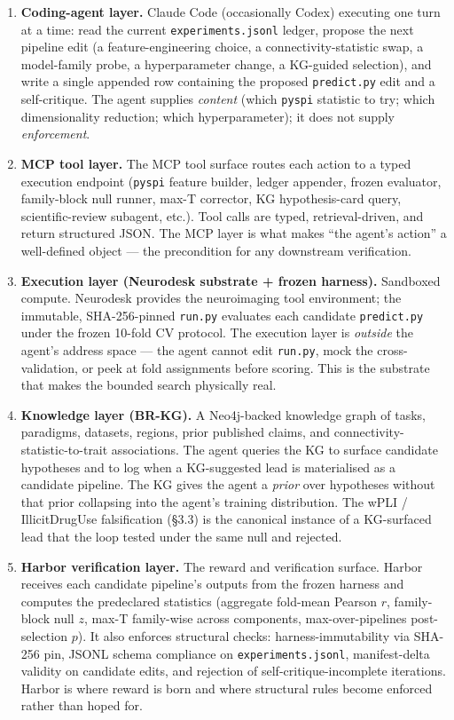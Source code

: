\documentclass[11pt,letterpaper]{report}
\begin{document}
\begin{enumerate}[leftmargin=1.6em,itemsep=0.25em]
\item \textbf{Coding-agent layer.} Claude Code (occasionally Codex) executing one turn at a time: read the current \texttt{experiments.jsonl} ledger, propose the next pipeline edit (a feature-engineering choice, a connectivity-statistic swap, a model-family probe, a hyperparameter change, a KG-guided selection), and write a single appended row containing the proposed \texttt{predict.py} edit and a self-critique. The agent supplies \emph{content} (which \texttt{pyspi} statistic to try; which dimensionality reduction; which hyperparameter); it does not supply \emph{enforcement}.
\item \textbf{MCP tool layer.} The MCP tool surface routes each action to a typed execution endpoint (\texttt{pyspi} feature builder, ledger appender, frozen evaluator, family-block null runner, max-T corrector, KG hypothesis-card query, scientific-review subagent, etc.). Tool calls are typed, retrieval-driven, and return structured JSON. The MCP layer is what makes ``the agent's action'' a well-defined object --- the precondition for any downstream verification.
\item \textbf{Execution layer (Neurodesk substrate + frozen harness).} Sandboxed compute. Neurodesk provides the neuroimaging tool environment; the immutable, SHA-256-pinned \texttt{run.py} evaluates each candidate \texttt{predict.py} under the frozen 10-fold CV protocol. The execution layer is \emph{outside} the agent's address space --- the agent cannot edit \texttt{run.py}, mock the cross-validation, or peek at fold assignments before scoring. This is the substrate that makes the bounded search physically real.
\item \textbf{Knowledge layer (BR-KG).} A Neo4j-backed knowledge graph of tasks, paradigms, datasets, regions, prior published claims, and connectivity-statistic-to-trait associations. The agent queries the KG to surface candidate hypotheses and to log when a KG-suggested lead is materialised as a candidate pipeline. The KG gives the agent a \emph{prior} over hypotheses without that prior collapsing into the agent's training distribution. The wPLI / IllicitDrugUse falsification (\S3.3) is the canonical instance of a KG-surfaced lead that the loop tested under the same null and rejected.
\item \textbf{Harbor verification layer.} The reward and verification surface. Harbor receives each candidate pipeline's outputs from the frozen harness and computes the predeclared statistics (aggregate fold-mean Pearson $r$, family-block null $z$, max-T family-wise across components, max-over-pipelines post-selection $p$). It also enforces structural checks: harness-immutability via SHA-256 pin, JSONL schema compliance on \texttt{experiments.jsonl}, manifest-delta validity on candidate edits, and rejection of self-critique-incomplete iterations. Harbor is where reward is born and where structural rules become enforced rather than hoped for.

\end{enumerate}
\end{document}
